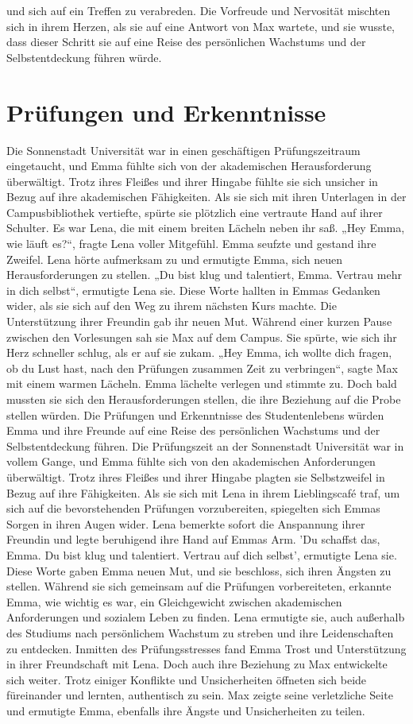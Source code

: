 \documentclass[12pt]{article} %
\begin{document}
und sich auf ein Treffen zu verabreden. Die Vorfreude und Nervosität mischten sich in ihrem Herzen, als sie auf eine Antwort von Max wartete, und sie wusste, dass dieser Schritt sie auf eine Reise des persönlichen Wachstums und der Selbstentdeckung führen würde.

\section{ Prüfungen und Erkenntnisse }
 Die Sonnenstadt Universität war in einen geschäftigen Prüfungszeitraum eingetaucht, und Emma fühlte sich von der akademischen Herausforderung überwältigt. Trotz ihres Fleißes und ihrer Hingabe fühlte sie sich unsicher in Bezug auf ihre akademischen Fähigkeiten. Als sie sich mit ihren Unterlagen in der Campusbibliothek vertiefte, spürte sie plötzlich eine vertraute Hand auf ihrer Schulter. Es war Lena, die mit einem breiten Lächeln neben ihr saß. „Hey Emma, wie läuft es?“, fragte Lena voller Mitgefühl. Emma seufzte und gestand ihre Zweifel. Lena hörte aufmerksam zu und ermutigte Emma, sich neuen Herausforderungen zu stellen. „Du bist klug und talentiert, Emma. Vertrau mehr in dich selbst“, ermutigte Lena sie. Diese Worte hallten in Emmas Gedanken wider, als sie sich auf den Weg zu ihrem nächsten Kurs machte. Die Unterstützung ihrer Freundin gab ihr neuen Mut. Während einer kurzen Pause zwischen den Vorlesungen sah sie Max auf dem Campus. Sie spürte, wie sich ihr Herz schneller schlug, als er auf sie zukam. „Hey Emma, ich wollte dich fragen, ob du Lust hast, nach den Prüfungen zusammen Zeit zu verbringen“, sagte Max mit einem warmen Lächeln. Emma lächelte verlegen und stimmte zu. Doch bald mussten sie sich den Herausforderungen stellen, die ihre Beziehung auf die Probe stellen würden. Die Prüfungen und Erkenntnisse des Studentenlebens würden Emma und ihre Freunde auf eine Reise des persönlichen Wachstums und der Selbstentdeckung führen. Die Prüfungszeit an der Sonnenstadt Universität war in vollem Gange, und Emma fühlte sich von den akademischen Anforderungen überwältigt. Trotz ihres Fleißes und ihrer Hingabe plagten sie Selbstzweifel in Bezug auf ihre Fähigkeiten. Als sie sich mit Lena in ihrem Lieblingscafé traf, um sich auf die bevorstehenden Prüfungen vorzubereiten, spiegelten sich Emmas Sorgen in ihren Augen wider. Lena bemerkte sofort die Anspannung ihrer Freundin und legte beruhigend ihre Hand auf Emmas Arm. 'Du schaffst das, Emma. Du bist klug und talentiert. Vertrau auf dich selbst', ermutigte Lena sie. Diese Worte gaben Emma neuen Mut, und sie beschloss, sich ihren Ängsten zu stellen. Während sie sich gemeinsam auf die Prüfungen vorbereiteten, erkannte Emma, wie wichtig es war, ein Gleichgewicht zwischen akademischen Anforderungen und sozialem Leben zu finden. Lena ermutigte sie, auch außerhalb des Studiums nach persönlichem Wachstum zu streben und ihre Leidenschaften zu entdecken. Inmitten des Prüfungsstresses fand Emma Trost und Unterstützung in ihrer Freundschaft mit Lena. Doch auch ihre Beziehung zu Max entwickelte sich weiter. Trotz einiger Konflikte und Unsicherheiten öffneten sich beide füreinander und lernten, authentisch zu sein. Max zeigte seine verletzliche Seite und ermutigte Emma, ebenfalls ihre Ängste und Unsicherheiten zu teilen. 
\end{document}
